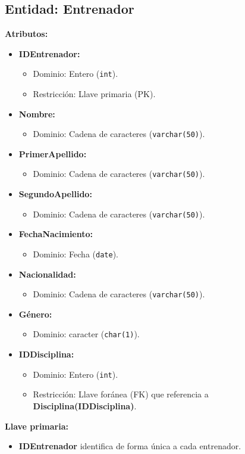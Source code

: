 \subsection*{Entidad: Entrenador}
\textbf{Atributos:}
\begin{itemize}
    \item \textbf{IDEntrenador:}
    \begin{itemize}
        \item Dominio: Entero (\texttt{int}).
        \item Restricción: Llave primaria (PK).
    \end{itemize}
    \item \textbf{Nombre:}
    \begin{itemize}
        \item Dominio: Cadena de caracteres (\texttt{varchar(50)}).
    \end{itemize}
    \item \textbf{PrimerApellido:}
    \begin{itemize}
        \item Dominio: Cadena de caracteres (\texttt{varchar(50)}).
    \end{itemize}
    \item \textbf{SegundoApellido:}
    \begin{itemize}
        \item Dominio: Cadena de caracteres (\texttt{varchar(50)}).
    \end{itemize}
    \item \textbf{FechaNacimiento:}
    \begin{itemize}
        \item Dominio: Fecha (\texttt{date}).
    \end{itemize}
    \item \textbf{Nacionalidad:}
    \begin{itemize}
        \item Dominio: Cadena de caracteres (\texttt{varchar(50)}).
    \end{itemize}
    \item \textbf{Género:}
    \begin{itemize}
        \item Dominio: caracter (\texttt{char(1)}).
    \end{itemize}
    \item \textbf{IDDisciplina:}
    \begin{itemize}
        \item Dominio: Entero (\texttt{int}).
        \item Restricción: Llave foránea (FK) que referencia a \textbf{Disciplina(IDDisciplina)}.
    \end{itemize}
\end{itemize}
\textbf{Llave primaria:}
\begin{itemize}
    \item \textbf{IDEntrenador} identifica de forma única a cada entrenador.
\end{itemize}
